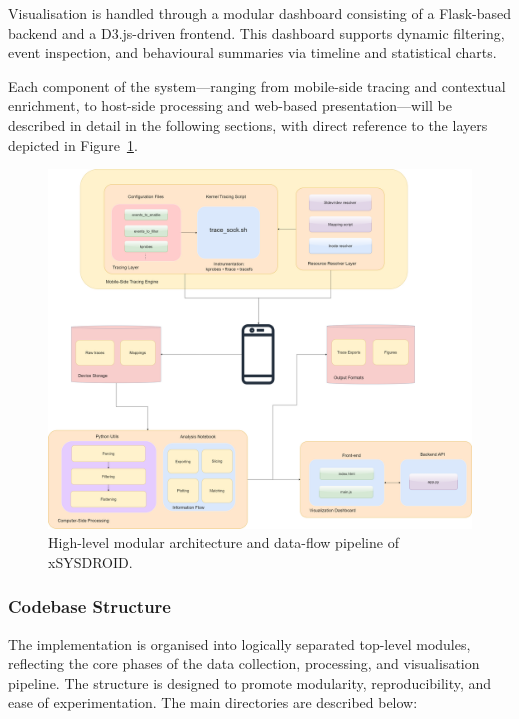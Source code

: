 \documentclass[a4paper,12pt]{report}
\begin{document}
Visualisation is handled through a modular dashboard consisting of a Flask-based backend and a D3.js-driven frontend. This dashboard supports dynamic filtering, event inspection, and behavioural summaries via timeline and statistical charts.

Each component of the system—ranging from mobile-side tracing and contextual enrichment, to host-side processing and web-based presentation—will be described in detail in the following sections, with direct reference to the layers depicted in Figure~\ref{fig:architecture}.
\begin{figure}[H]
\centering
\includegraphics[width=1\textwidth]{architecture.png}
\caption{High-level modular architecture and data-flow pipeline of xSYSDROID.}
\label{fig:architecture}
\end{figure}



\subsubsection{Codebase Structure}

The implementation is organised into logically separated top-level modules, reflecting the core phases of the data collection, processing, and visualisation pipeline. The structure is designed to promote modularity, reproducibility, and ease of experimentation. The main directories are described below:
\end{document}
